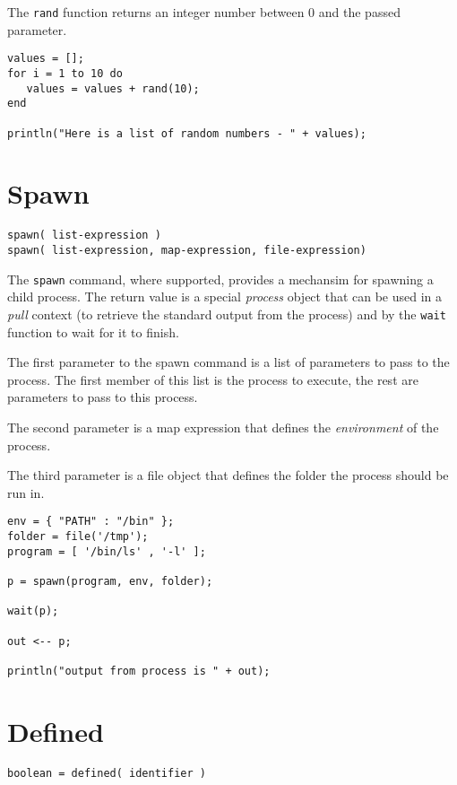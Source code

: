 The \Verb+rand+ function returns an integer number between 0 and the passed parameter.

\begin{lstlisting}[caption={Rand example}]
values = [];
for i = 1 to 10 do
   values = values + rand(10);
end

println("Here is a list of random numbers - " + values);

\end{lstlisting}

\section{Spawn}

\begin{Verbatim}
spawn( list-expression )
spawn( list-expression, map-expression, file-expression)
\end{Verbatim}

The \Verb+spawn+ command, where supported, provides a mechansim for spawning a child process. The return value is a special \emph{process} object that can be used in a \emph{pull} context (to retrieve the standard output from the process) and by the \verb+wait+ function to wait for it to finish.

The first parameter to the spawn command is a list of parameters to pass to the process. The first member of this list is the process to execute, the rest are parameters to pass to this process.

The second parameter is a map expression that defines the \emph{environment} of the process.

The third parameter is a file object that defines the folder the process should be run in.

\begin{lstlisting}[caption={Spawn example}]
env = { "PATH" : "/bin" };
folder = file('/tmp');
program = [ '/bin/ls' , '-l' ];

p = spawn(program, env, folder);

wait(p);

out <-- p;

println("output from process is " + out);
\end{lstlisting}

\section{Defined}

\begin{Verbatim}
boolean = defined( identifier )
\end{Verbatim}

